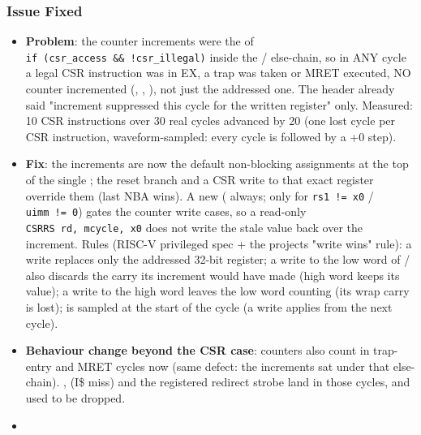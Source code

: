 \subsubsection{Issue Fixed}\label{cr:fix:fixes-index:issue-fixed-7}

\begin{record}

\begin{itemize}
\tightlist
\item
  \textbf{Problem}: the counter increments were the  of
  \texttt{if\ (csr\_\allowbreak{}access\ \&\&\ !csr\_\allowbreak{}illegal)}
  inside the  /  else-chain, so in ANY cycle
  a legal CSR instruction was in EX, a trap was taken or MRET executed,
  NO counter incremented (, ,
  ), not just the addressed one. The header
  already said "increment suppressed this cycle for the written
  register" only. Measured: 10 CSR instructions over 30 real cycles
  advanced  by 20 (one lost cycle per CSR instruction,
  waveform-sampled: every  cycle is followed by a +0
  step).
\item
  \textbf{Fix}: the increments are now the default non-blocking
  assignments at the top of the single ; the reset
  branch and a CSR write to that exact register override them (last NBA
  wins). A new  ( always;
   only for \texttt{rs1\ !=\allowbreak{}\ x0} /
  \texttt{uimm\ !=\allowbreak{}\ 0}) gates the counter write cases, so a
  read-only \texttt{CSRRS\ rd,\allowbreak{}\ mcycle,\allowbreak{}\ x0}
  does not write the stale value back over the increment. Rules (RISC-V
  privileged spec + the project\textquotesingle s "write wins" rule): a
  write replaces only the addressed 32-bit register; a write to the low
  word of / also discards the carry its
  increment would have made (high word keeps its value); a write to the
  high word leaves the low word counting (its wrap carry is lost);
   is sampled at the start of the cycle (a write
  applies from the next cycle).
\item
  \textbf{Behaviour change beyond the CSR case}: counters also count in
  trap-entry and MRET cycles now (same defect: the increments sat under
  that else-chain). ,  (I\$ miss) and
  the registered redirect strobe land in those cycles, and used to be
  dropped.
\item

\end{itemize}
\end{record}
